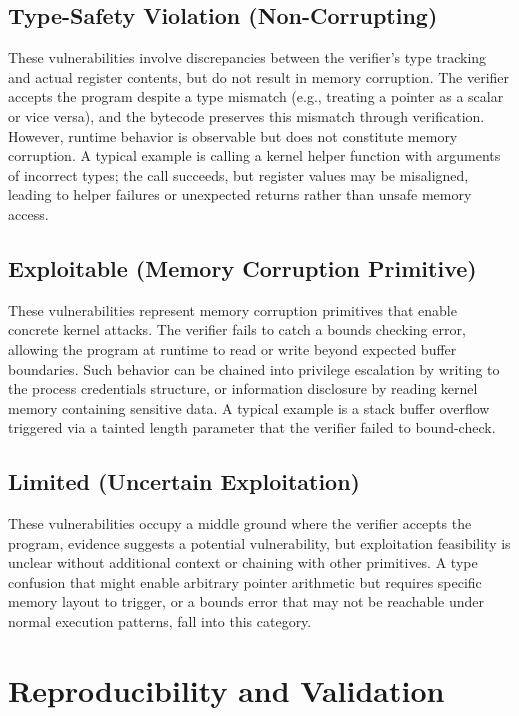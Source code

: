 \subsection{Type-Safety Violation (Non-Corrupting)}

These vulnerabilities involve discrepancies between the verifier's type tracking and actual register contents, but do not result in memory corruption. The verifier accepts the program despite a type mismatch (e.g., treating a pointer as a scalar or vice versa), and the bytecode preserves this mismatch through verification. However, runtime behavior is observable but does not constitute memory corruption. A typical example is calling a kernel helper function with arguments of incorrect types; the call succeeds, but register values may be misaligned, leading to helper failures or unexpected returns rather than unsafe memory access.

\subsection{Exploitable (Memory Corruption Primitive)}

These vulnerabilities represent memory corruption primitives that enable concrete kernel attacks. The verifier fails to catch a bounds checking error, allowing the program at runtime to read or write beyond expected buffer boundaries. Such behavior can be chained into privilege escalation by writing to the process credentials structure, or information disclosure by reading kernel memory containing sensitive data. A typical example is a stack buffer overflow triggered via a tainted length parameter that the verifier failed to bound-check.

\subsection{Limited (Uncertain Exploitation)}

These vulnerabilities occupy a middle ground where the verifier accepts the program, evidence suggests a potential vulnerability, but exploitation feasibility is unclear without additional context or chaining with other primitives. A type confusion that might enable arbitrary pointer arithmetic but requires specific memory layout to trigger, or a bounds error that may not be reachable under normal execution patterns, fall into this category.

\section{Reproducibility and Validation}

